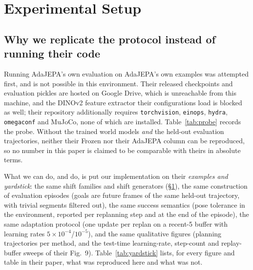 \section{Experimental Setup}\label{sec:setup}

\subsection{Why we replicate the protocol instead of running their code}\label{sec:why}

Running AdaJEPA's own evaluation on AdaJEPA's own examples was attempted first, and is not
possible in this environment. Their released checkpoints and evaluation pickles are hosted on
Google Drive, which is unreachable from this machine, and the DINOv2 feature extractor their
configurations load is blocked as well; their repository additionally requires
\texttt{torchvision}, \texttt{einops}, \texttt{hydra}, \texttt{omegaconf} and MuJoCo, none of
which are installed. Table~\ref{tab:probe} records the probe. Without the trained world models
\emph{and} the held-out evaluation trajectories, neither their Frozen nor their AdaJEPA column
can be reproduced, so no number in this paper is claimed to be comparable with theirs in
absolute terms.

What we can do, and do, is put our implementation on their \emph{examples and yardstick}: the
same shift families and shift generators (\S\ref{sec:setup}), the same construction of
evaluation episodes (goals are future frames of the same held-out trajectory, with trivial
segments filtered out), the same success semantics (pose tolerance in the environment, reported
per replanning step and at the end of the episode), the same adaptation protocol (one update per
replan on a recent-5 buffer with learning rates $5\times10^{-4}$/$10^{-5}$), and the same
qualitative figures (planning trajectories per method, and the test-time learning-rate, step-count
and replay-buffer sweeps of their Fig.~9). Table~\ref{tab:yardstick} lists, for every figure and
table in their paper, what was reproduced here and what was not.

